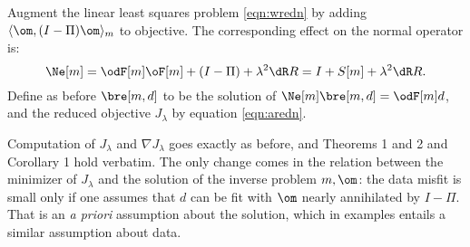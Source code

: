Augment the linear least squares problem \ref{eqn:wredn} by adding
$\langle \om, (I-\Pi)\om\rangle_m$ to objective. The corresponding
effect on the normal operator is:
\[
\Ne[m] = \odF[m]\oF[m] + (I-\Pi) + \lambda^2 \dR R = I + S[m] +
\lambda^2\dR R.
\]
Define as before $\bre[m,d]$ to be the solution of $\Ne[m]
\bre[m,d] = \odF[m]d$, and the reduced objective $J_{\lambda}$ by
equation \ref{eqn:aredn}. 

Computation of $J_{\lambda}$ and $\nabla J_{\lambda}$ goes exactly as
before, and Theorems 1 and 2 and Corollary 1 hold verbatim. The only
change comes in the relation between the minimizer of $J_{\lambda}$
and the solution of the inverse problem $m,\om$: the data misfit is
small only if one assumes that $d$ can be fit with $\om$ nearly
annihilated by $I-\Pi$. That is an {\em a priori} assumption about the
solution, which in examples entails a similar assumption about data. 




